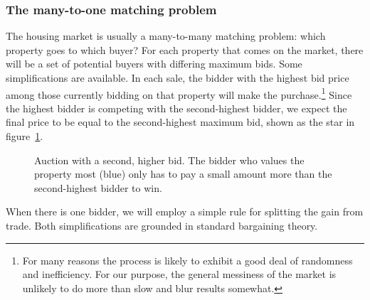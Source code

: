 

\subsubsection{The many-to-one matching problem}
{The housing market is usually a many-to-many matching problem}: which property goes to which buyer? For each property that comes on the market, there will be a set of potential buyers with differing maximum bids. Some simplifications are available. In each sale, the bidder with the highest bid price among those currently bidding on that property will make the purchase.\footnote{For many reasons the process is likely to exhibit a good deal of randomness and inefficiency. For our purpose, the general messiness of the market is unlikely to do more than slow and blur results somewhat.} Since the highest bidder is competing with the second-highest bidder, we expect the final price to be equal to the second-highest maximum bid, shown as the star in figure~\ref{fig:auction-game}. 


    \begin{figure}
        \centering
        
        \caption[Auction with a second, higher bid]{Auction with a second, higher bid. The bidder who values the property most (blue) only has to pay a small amount more than the second-highest bidder to win.}
        \label{fig:auction-game}
    \end{figure}

When there is one bidder, we will employ a simple rule for splitting the gain from trade. Both simplifications are grounded in standard bargaining theory.

